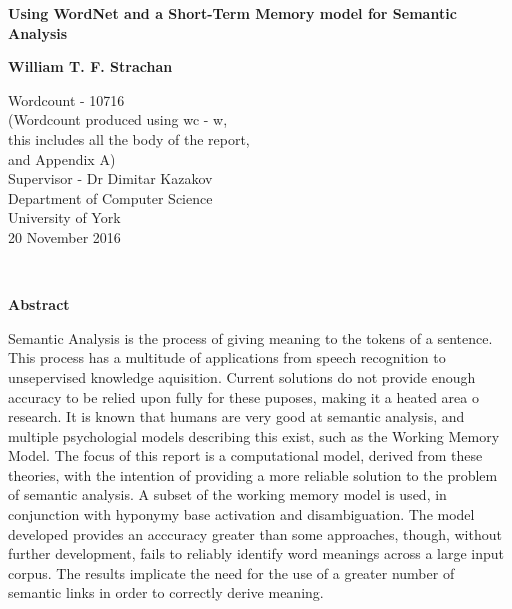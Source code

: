 \documentclass[]{article}
\begin{document}
\begin{titlepage}
    \begin{center}
        \vspace*{1cm}
        
        \Huge
        \textbf{Using WordNet and a Short-Term Memory model for Semantic Analysis}
        \vspace{2cm}
        
        \Large
        \textbf{William T. F. Strachan}
        
        \vfill
                
        \vspace{0.8cm}
        
        \Large
        Wordcount - 10716\\
        \small
        (Wordcount produced using wc - w, \\
        this includes all the body of the report,\\
         and Appendix A)\\
        \large
        \vspace{0.8cm}
        Supervisor - Dr Dimitar Kazakov\\
        Department of Computer Science\\
        University of York\\
        20 November 2016
        
    \end{center}
\end{titlepage}
\
\vfill
\begin{center}
	\textbf{Abstract}
\end{center} 
\label{sec:Abstract}
Semantic Analysis is the process of giving meaning to the tokens of a sentence. This process has a multitude of applications from speech recognition to unsepervised knowledge aquisition. Current solutions do not provide enough accuracy to be relied upon fully for these puposes, making it a heated area o research. It is known that humans are very good at semantic analysis, and multiple psychologial models describing this exist, such as the Working Memory Model. The focus of this report is a computational model, derived from these theories, with the intention of providing a more reliable solution to the problem of semantic analysis. A subset of the working memory model is used, in conjunction with hyponymy base activation and disambiguation. The model developed provides an acccuracy greater than some approaches, though, without further development, fails to reliably identify word meanings across a large input corpus. The results implicate the need for the use of a greater number of semantic links in order to correctly derive meaning.
\end{document}
